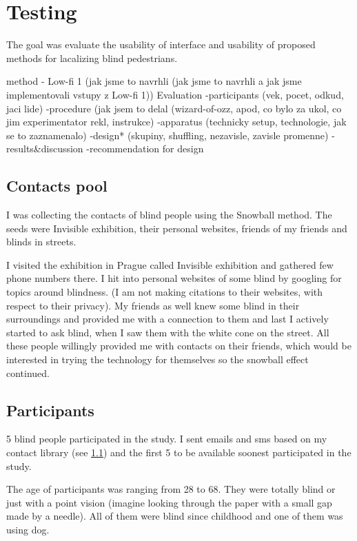 	\chapter{Testing}	
		
	The goal was evaluate the usability of interface and usability of proposed methods for lacalizing blind pedestrians. 
	
	method - Low-fi 1
	(jak jsme to navrhli (jak jsme to navrhli a jak jsme implementovali vstupy z Low-fi 1))
	Evaluation
	-participants (vek, pocet, odkud, jaci lide)
	-procedure (jak jsem to delal (wizard-of-ozz, apod, co bylo za ukol, co jim experimentator rekl, instrukce)
	-apparatus (technicky setup, technologie, jak se to zaznamenalo)
	-design* (skupiny, shuffling, nezavisle, zavisle promenne)
	-results\&discussion
	-recommendation for design
	
	\section{Contacts pool} \label{sec:contactsPool}
	I was collecting the contacts of blind people using the Snowball method. The seeds were Invisible exhibition, their personal websites, friends of my friends and blinds in streets.
	
	I visited the exhibition in Prague called Invisible exhibition \cite{later} and gathered few phone numbers there. I hit into personal websites of some blind by googling for topics around blindness. (I am not making citations to their websites, with respect to their privacy). My friends as well knew some blind in their surroundings and provided me with a connection to them and last I actively started to ask blind, when I saw them with the white cone on the street. All these people willingly provided me with contacts on their friends, which would be interested in trying the technology for themselves so the snowball effect continued.
	\section{Participants}
	
	5 blind people participated in the study. I sent emails and sms based on my contact library (see \ref{sec:contactsPool}) and the first 5 to be available soonest participated in the study. 
	
	The age of participants was ranging from 28 to 68.
	They were totally blind or just with a point vision (imagine looking through the paper with a small gap made by a needle).
	All of them were blind since childhood and one of them was using dog.

